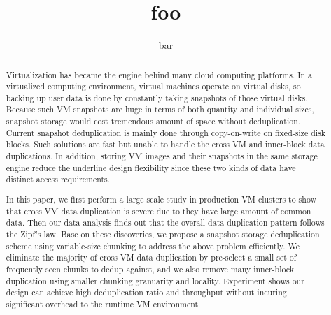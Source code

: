 \documentclass[finalversion]{usetex-v1}
\begin{document}
\title{foo}
\author{bar}
\date{}
\maketitle

\begin{abstract}
Virtualization has became the engine behind many cloud computing platforms.
In a virtualized computing environment, virtual machines
operate on virtual disks, so backing up user data is done by constantly 
taking snapshots of those virtual disks. Because such VM snapshots are huge in
terms of both quantity and individual sizes, snapshot storage would cost tremendous amount 
of space without deduplication.
Current snapshot deduplication is mainly done through copy-on-write 
on fixed-size disk blocks. Such solutions are fast but unable to handle the
 cross VM and inner-block data duplications. In addition, storing VM images and their snapshots
in the same storage engine reduce the underline design flexibility since these two kinds of data
have distinct access requirements.

In this paper, we first perform a large scale study in production VM clusters 
to show that cross VM data duplication is severe due to they have large amount of
common data. Then our data analysis finds out that the overall data duplication pattern follows the Zipf's law.
Base on these discoveries, we propose a snapshot storage deduplication scheme using variable-size chunking
to address the above problem efficiently.
We eliminate the majority of cross VM data duplication by pre-select
a small set of frequently seen chunks to dedup against, and we also remove
many inner-block duplication using smaller chunking granuarity and locality.
Experiment shows our design can achieve high deduplication ratio and throughput
without incuring significant overhead to the runtime VM environment.
\end{abstract}


%

%

%


\end{document}
